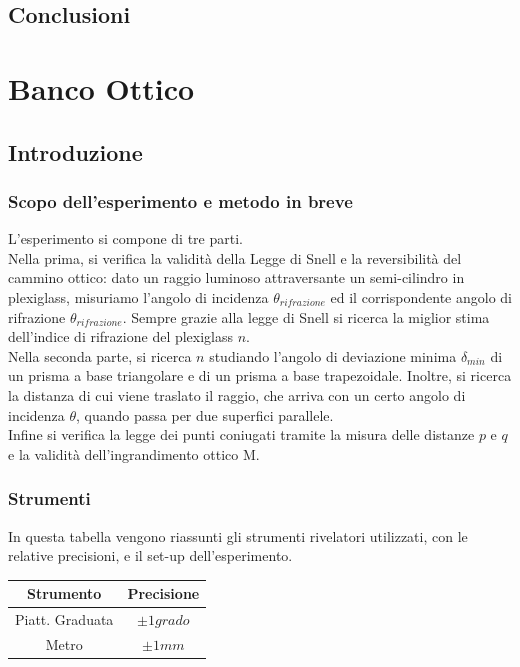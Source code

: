 \documentclass[a4paper,10pt]{report}
\begin{document}
\section{Conclusioni}

\chapter{Banco Ottico}
\section{Introduzione}
\subsection{Scopo dell'esperimento e metodo in breve}
L'esperimento si compone di tre parti.
\\

Nella prima, si verifica la validità della Legge di Snell e la reversibilità del cammino ottico: dato un raggio luminoso attraversante un semi-cilindro in plexiglass, misuriamo l'angolo di incidenza $\theta_{rifrazione}$ ed il corrispondente  angolo di rifrazione $\theta_{rifrazione}$. Sempre grazie alla legge di Snell si ricerca la miglior stima dell'indice di rifrazione del plexiglass $n$.
\\

Nella seconda parte, si ricerca $n$ studiando l'angolo di deviazione minima $\delta_{min}$ di un prisma a base triangolare e di un prisma a base trapezoidale. 
Inoltre, si ricerca la distanza di cui viene traslato il raggio, che arriva con un certo angolo di incidenza $\theta$, quando passa per due superfici parallele.
\\

Infine si verifica la legge dei punti coniugati tramite la misura delle distanze $p$ e $q$ e la validità dell'ingrandimento ottico M. 

\subsection{Strumenti}
In questa tabella vengono riassunti gli strumenti rivelatori utilizzati, con le relative precisioni, e il set-up dell'esperimento.\\
\begin{center}
\begin{tabular}{c|c}
Strumento & Precisione \\
\midrule
Piatt. Graduata & $\pm 1 grado $ \\
Metro & $\pm 1 mm $\\
\end{tabular}
\end{center}
\end{document}
